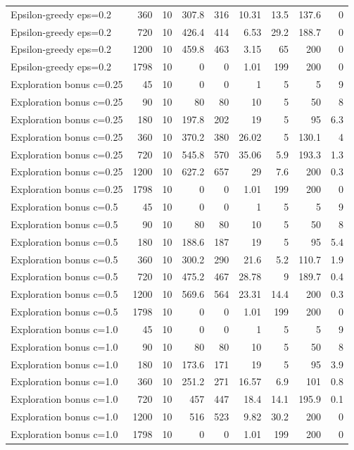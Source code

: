 \begin{landscape}
\begin{scriptsize}
\begin{longtable}{lrrrrrrrr}
Epsilon-greedy eps=0.2 & 360 & 10 & 307.8 & 316 & 10.31 & 13.5 & 137.6 & 0 \\
Epsilon-greedy eps=0.2 & 720 & 10 & 426.4 & 414 & 6.53 & 29.2 & 188.7 & 0 \\
Epsilon-greedy eps=0.2 & 1200 & 10 & 459.8 & 463 & 3.15 & 65 & 200 & 0 \\
Epsilon-greedy eps=0.2 & 1798 & 10 & 0 & 0 & 1.01 & 199 & 200 & 0 \\
Exploration bonus c=0.25 & 45 & 10 & 0 & 0 & 1 & 5 & 5 & 9 \\
Exploration bonus c=0.25 & 90 & 10 & 80 & 80 & 10 & 5 & 50 & 8 \\
Exploration bonus c=0.25 & 180 & 10 & 197.8 & 202 & 19 & 5 & 95 & 6.3 \\
Exploration bonus c=0.25 & 360 & 10 & 370.2 & 380 & 26.02 & 5 & 130.1 & 4 \\
Exploration bonus c=0.25 & 720 & 10 & 545.8 & 570 & 35.06 & 5.9 & 193.3 & 1.3 \\
Exploration bonus c=0.25 & 1200 & 10 & 627.2 & 657 & 29 & 7.6 & 200 & 0.3 \\
Exploration bonus c=0.25 & 1798 & 10 & 0 & 0 & 1.01 & 199 & 200 & 0 \\
Exploration bonus c=0.5 & 45 & 10 & 0 & 0 & 1 & 5 & 5 & 9 \\
Exploration bonus c=0.5 & 90 & 10 & 80 & 80 & 10 & 5 & 50 & 8 \\
Exploration bonus c=0.5 & 180 & 10 & 188.6 & 187 & 19 & 5 & 95 & 5.4 \\
Exploration bonus c=0.5 & 360 & 10 & 300.2 & 290 & 21.6 & 5.2 & 110.7 & 1.9 \\
Exploration bonus c=0.5 & 720 & 10 & 475.2 & 467 & 28.78 & 9 & 189.7 & 0.4 \\
Exploration bonus c=0.5 & 1200 & 10 & 569.6 & 564 & 23.31 & 14.4 & 200 & 0.3 \\
Exploration bonus c=0.5 & 1798 & 10 & 0 & 0 & 1.01 & 199 & 200 & 0 \\
Exploration bonus c=1.0 & 45 & 10 & 0 & 0 & 1 & 5 & 5 & 9 \\
Exploration bonus c=1.0 & 90 & 10 & 80 & 80 & 10 & 5 & 50 & 8 \\
Exploration bonus c=1.0 & 180 & 10 & 173.6 & 171 & 19 & 5 & 95 & 3.9 \\
Exploration bonus c=1.0 & 360 & 10 & 251.2 & 271 & 16.57 & 6.9 & 101 & 0.8 \\
Exploration bonus c=1.0 & 720 & 10 & 457 & 447 & 18.4 & 14.1 & 195.9 & 0.1 \\
Exploration bonus c=1.0 & 1200 & 10 & 516 & 523 & 9.82 & 30.2 & 200 & 0 \\
Exploration bonus c=1.0 & 1798 & 10 & 0 & 0 & 1.01 & 199 & 200 & 0 \\
\bottomrule
\end{longtable}
\end{scriptsize}
\end{landscape}
